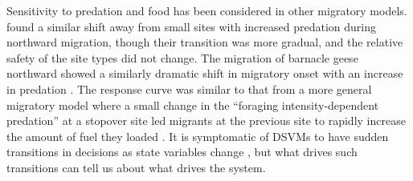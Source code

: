 

Sensitivity to predation and food has been considered in other migratory models. \citet{Taylor2007} found a similar shift away from small sites with increased predation during northward migration, though their transition was more gradual, and the relative safety of the site types did not change. The migration of barnacle geese northward showed a similarly dramatic shift in migratory onset with an increase in predation \citep{Jonker2010}. The response curve was similar to that from a more general migratory model where a small change in the ``foraging intensity-dependent predation'' at a stopover site led migrants at the previous site to rapidly increase the amount of fuel they loaded \citep{Weber1998}. It is symptomatic of DSVMs to have sudden transitions in decisions as state variables change \citep{ClarkMangel2000}, but what drives such transitions can tell us about what drives the system.


